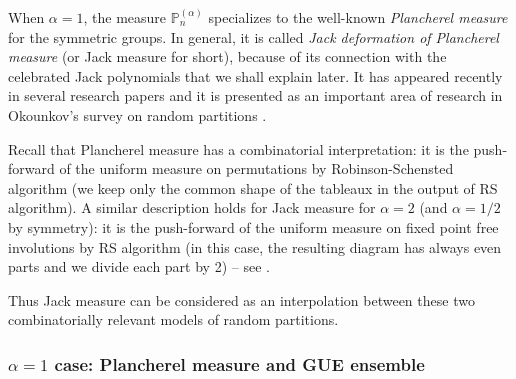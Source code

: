 \documentclass[11pt]{amsart}
\theoremstyle{plain}
\theoremstyle{remark}
\newcommand{\PP}{\mathbb{P}}
\begin{document}
When $\alpha=1$, the measure $\PP_n^{(\alpha)}$ specializes to the well-known \emph{Plancherel measure}
for the symmetric groups.
In general, it is called {\em Jack deformation of Plancherel measure} (or Jack measure for short),
because of its connection with the celebrated Jack polynomials that we shall explain later.
It has appeared recently in
several research papers \cite{BorodinOlshanskiJackZMeasure,FulmanFluctuationChA2,
MatsumotoJackPlancherelFewRows,OlshanskiJackPlancherel,MatsumotoOddJM}
and it is presented as an important area of research in Okounkov's survey on 
random partitions \cite[Section 3.3]{OkounkovRandomPartitions}.

Recall that Plancherel measure has a combinatorial interpretation:
it is the push-forward of the uniform measure on permutations
by Robinson-Schensted algorithm (we keep only the common shape of the
tableaux in the output of RS algorithm).
A similar description holds for Jack measure for $\alpha=2$
(and $\alpha=1/2$ by symmetry): it is the push-forward of
the uniform measure on fixed point free involutions by RS algorithm
(in this case, the resulting diagram has always even parts
and we divide each part by 2) -- see \cite[Section 3]{MatsumotoJackPlancherelFewRows}.

Thus Jack measure can be considered as an interpolation between 
these two combinatorially relevant models of random partitions.

\subsubsection{$\alpha = 1$ case: Plancherel measure and GUE ensemble}
\end{document}
